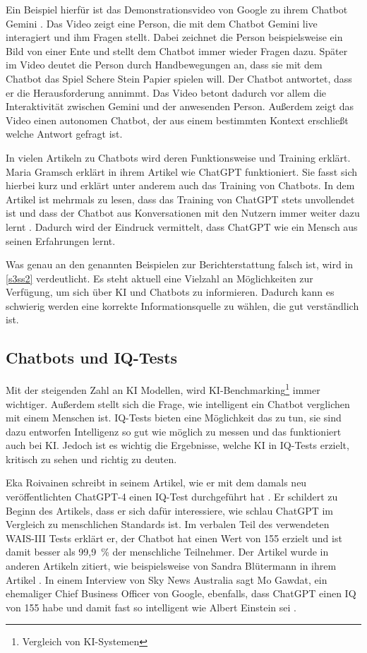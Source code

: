 	Ein Beispiel hierfür ist das Demonstrationsvideo von Google zu ihrem Chatbot Gemini \cite{gminiDemo2023}. 
	Das Video zeigt eine Person, die mit dem Chatbot Gemini live interagiert und ihm Fragen stellt. Dabei
	zeichnet die Person beispielsweise ein Bild von einer Ente und stellt dem Chatbot immer wieder Fragen dazu.
	Später im Video deutet die Person durch Handbewegungen an, dass sie mit dem Chatbot das Spiel \glqq{}Schere
	Stein Papier\grqq{} spielen will. Der Chatbot antwortet, dass er die Herausforderung annimmt. Das Video
	betont dadurch vor allem die Interaktivität zwischen Gemini und der anwesenden Person. Außerdem zeigt das
	Video einen autonomen Chatbot, der aus einem bestimmten Kontext erschließt welche Antwort gefragt ist. 

	In vielen Artikeln zu Chatbots wird deren Funktionsweise und Training erklärt. Maria Gramsch erklärt in 
	ihrem Artikel wie ChatGPT funktioniert. Sie fasst sich hierbei kurz und erklärt unter anderem
	auch das Training von Chatbots. In dem Artikel ist mehrmals zu lesen, dass das Training von ChatGPT stets
	unvollendet ist und dass der Chatbot aus Konversationen mit den Nutzern immer weiter dazu lernt \cite{gramsch23}. 
	Dadurch wird der Eindruck vermittelt, dass ChatGPT wie ein Mensch aus seinen Erfahrungen lernt.

	Was genau an den genannten Beispielen zur Berichterstattung falsch ist, wird in \ref{s3ss2} verdeutlicht. 
	Es steht aktuell eine Vielzahl an Möglichkeiten zur Verfügung, um sich über KI und Chatbots zu informieren. 
	Dadurch kann es schwierig werden eine korrekte Informationsquelle zu wählen, die gut verständlich ist.   	 	 
	
	\clearpage
	\subsection{Chatbots und IQ-Tests}\label{s1ss3}
	Mit der steigenden Zahl an KI Modellen, wird KI-Benchmarking\footnote{Vergleich von KI-Systemen} immer wichtiger. 
	Außerdem stellt sich die Frage, wie intelligent ein Chatbot verglichen mit einem Menschen ist. IQ-Tests 
	bieten eine Möglichkeit das zu tun, sie sind dazu entworfen Intelligenz so gut wie möglich zu messen und das 
	funktioniert auch bei KI. Jedoch ist es wichtig die Ergebnisse, welche KI in IQ-Tests erzielt, kritisch zu
	sehen und richtig zu deuten.

	Eka Roivainen schreibt in seinem Artikel, wie er mit dem damals neu veröffentlichten ChatGPT-4 einen IQ-Test
	durchgeführt hat \cite{roivainen23}. Er schildert zu Beginn des Artikels, dass er sich dafür interessiere, wie
	schlau ChatGPT im Vergleich zu menschlichen Standards ist. Im verbalen Teil des verwendeten WAIS-III Tests
	erklärt er, der Chatbot hat einen Wert von 155 erzielt und ist damit besser als \mbox{99,9 \%} der menschliche Teilnehmer.
	Der Artikel wurde in anderen Artikeln zitiert, wie beispielsweise von Sandra Blütermann in ihrem Artikel
	\cite{blutermann23}. In einem Interview von Sky News Australia sagt Mo Gawdat, ein ehemaliger Chief Business
	Officer von Google, ebenfalls, dass ChatGPT einen IQ von 155 habe und damit fast so intelligent wie Albert Einstein
	sei \cite{gawdat23}.

